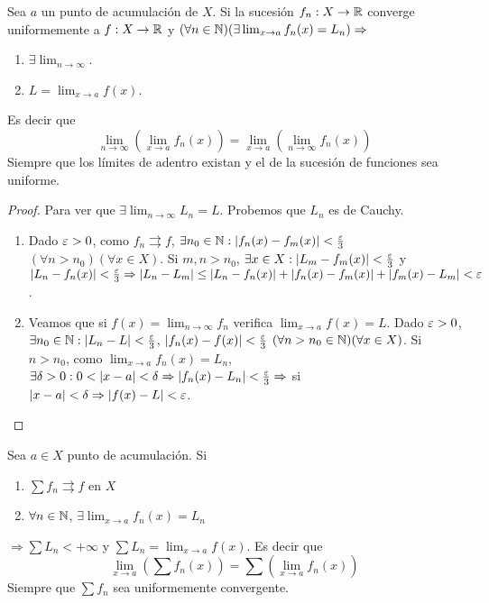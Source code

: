 \begin{theorem}
  Sea $a$ un punto de acumulación de $X$. Si la sucesión $f_n: X \to \mathbb{R}$ converge uniformemente a $f: X \to \mathbb{R}$ y $(\forall n \in \mathbb{N})(\exists \lim_{x \to a} f_n(x) = L_n) \Rightarrow$
  \begin{enumerate}
    \item $\exists \lim_{n \to \infty}$.
    \item $L = \lim_{x \to a} f(x)$.
  \end{enumerate}
  Es decir que \begin{equation}
    \lim_{n \to \infty}(\lim_{x \to a} f_n(x)) = \lim_{x \to a}(\lim_{n \to \infty} f_n(x))
  \end{equation}
  Siempre que los límites de adentro existan y el de la sucesión de funciones sea uniforme.

  \begin{proof}
    Para ver que $\exists \lim_{n \to \infty} L_n = L$. Probemos que $L_n$ es de Cauchy.
    \begin{enumerate}
      \item Dado $\varepsilon > 0$, como $f_n \rightrightarrows f$, $\exists n_0 \in \mathbb{N} : |f_n(x) - f_m(x)| < \frac{\varepsilon}{3}$ $(\forall n > n_0)(\forall x \in X)$. Si $m,n > n_0$, $\exists x \in X : |L_m - f_m(x)| < \frac{\varepsilon}{3}$ y $|L_n - f_n(x)| < \frac{\varepsilon}{3} \Rightarrow |L_n - L_m| \leq |L_n - f_n(x)| + |f_n(x) - f_m(x)| + |f_m(x) - L_m| < \varepsilon$.
      \item Veamos que si $f(x) = \lim_{n \to \infty} f_n$ verifica $\lim_{x \to a} f(x) = L$. Dado $\varepsilon > 0$, $\exists n_0 \in \mathbb{N} : |L_n - L| < \frac{\varepsilon}{3}$, $|f_n(x) - f(x)| < \frac{\varepsilon}{3}$ $(\forall n > n_0 \in \mathbb{N})(\forall x \in X)$. Si $n > n_0$, como $\lim_{x \to a} f_n(x) = L_n$, $\exists \delta > 0 : 0 < |x-a| < \delta \Rightarrow |f_n(x) - L_n| < \frac{\varepsilon}{3} \Rightarrow$ si $|x-a| < \delta \Rightarrow |f(x) - L| < \varepsilon$.
    \end{enumerate}
  \end{proof}
\end{theorem}

\begin{corollary}
  Sea $a \in X$ punto de acumulación. Si \begin{enumerate}
    \item $\sum f_n \rightrightarrows f$ en $X$
    \item $\forall n \in \mathbb{N}$, $\exists \lim_{x \to a} f_n(x) = L_n$
  \end{enumerate} $\Rightarrow \sum L_n < +\infty$ y $\sum L_n = \lim_{x \to a} f(x)$.
  Es decir que \begin{equation}
    \lim_{x \to a}(\sum f_n(x)) = \sum(\lim_{x \to a} f_n(x))
  \end{equation} Siempre que $\sum f_n$ sea uniformemente convergente.
\end{corollary}

